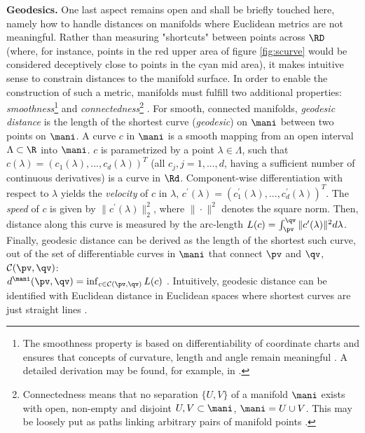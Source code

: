 \vspace{0.5cm}

\textbf{Geodesics.} One last aspect remains open and shall be briefly touched 
here, namely how to handle distances on manifolds where Euclidean metrics are 
not meaningful.
Rather than measuring "shortcuts" between points across $\RD$ (where, for 
instance, points in the red upper area of figure \ref{fig:scurve} would be 
considered deceptively close to points in the cyan mid area), it makes intuitive 
sense to constrain distances to the manifold surface.
In order to enable the construction of such a metric, manifolds must fulfill
two additional properties: \textit{smoothness}\footnote{
The smoothness property is based on differentiability of coordinate charts and 
ensures that concepts of curvature, length and angle remain meaningful 
\citep{mafu2011}.
A detailed derivation may be found, for example, in \citet{mukherjee2015}.
} and \textit{connectedness}\footnote{
Connectedness means that no separation $\{ U, V\}$ of a manifold 
$\mani$ exists with open, non-empty and disjoint $U, V \subset \mani$, 
$\mani = U \cup V$.
This may be loosely put as paths linking arbitrary pairs of manifold points 
\citep{mccleary2006}.
} \citep{mafu2011}.
For smooth, connected manifolds, \textit{geodesic distance} is the length of the 
shortest curve (\textit{geodesic}) on $\mani$ between two points on $\mani$.
A curve $c$ in $\mani$ is a smooth mapping from an open interval $\Lambda 
\subset \R$ into $\mani$.
$c$ is parametrized by a point $\lambda \in \Lambda$, such that
$c(\lambda) = (c_1(\lambda), ..., c_d(\lambda))^T$ (all $c_j, j = 1, ..., d$,
having a sufficient number of continuous derivatives) is a curve in $\Rd$.
Component-wise differentiation with respect to $\lambda$ yields the
\textit{velocity} of $c$ in $\lambda$, $c^{\prime}(\lambda) =
(c_1^{\prime}(\lambda), ..., c_d^{\prime}(\lambda))^T$.
The \textit{speed} of $c$ is given by $\| c^{\prime}(\lambda) \|^2_2$, where
$\| \cdot \|^2$ denotes the square norm.
Then, distance along this curve is measured by the arc-length
$L(c) = \int_{\pv}^{\qv} \| c^{\prime}(\lambda) \|^2 d\lambda$.
Finally, geodesic distance can be derived as the length of the shortest such
curve, out of the set of differentiable curves in $\mani$ that connect $\pv$ and
$\qv$, $\mathcal{C}(\pv, \qv)$: \\
$d^{\mani}(\pv, \qv) = \inf_{c \in \mathcal{C}(\pv, \qv)} L(c)$
\citep{mafu2011}.
Intuitively, geodesic distance can be identified with Euclidean distance in
Euclidean spaces where shortest curves are just straight lines \citep{mafu2011}.

